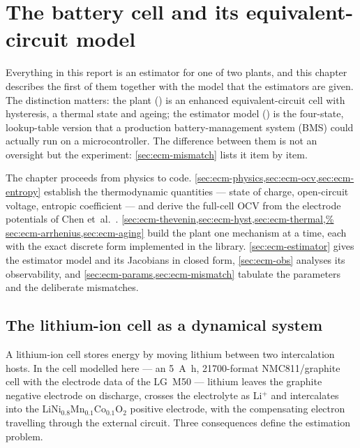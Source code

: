 \chapter{The battery cell and its equivalent-circuit model}
\label{ch:ecm}

Everything in this report is an estimator for one of two plants, and this chapter describes the
first of them together with the model that the estimators are given. The distinction matters:
the plant () is an enhanced equivalent-circuit cell
with hysteresis, a thermal state and ageing; the estimator model
() is the four-state, lookup-table version that a
production battery-management system (BMS) could actually run on a microcontroller. The
difference between them is not an oversight but the experiment: \cref{sec:ecm-mismatch} lists it
item by item.

The chapter proceeds from physics to code. \cref{sec:ecm-physics,sec:ecm-ocv,sec:ecm-entropy}
establish the thermodynamic quantities --- state of charge, open-circuit voltage, entropic
coefficient --- and derive the full-cell OCV from the electrode potentials of Chen
et~al.~\cite{chen2020parameterization}. \cref{sec:ecm-thevenin,sec:ecm-hyst,sec:ecm-thermal,%
sec:ecm-arrhenius,sec:ecm-aging} build the plant one mechanism at a time, each with the exact
discrete form implemented in the library. \cref{sec:ecm-estimator} gives the estimator model and
its Jacobians in closed form, \cref{sec:ecm-obs} analyses its observability, and
\cref{sec:ecm-params,sec:ecm-mismatch} tabulate the parameters and the deliberate mismatches.

\section{The lithium-ion cell as a dynamical system}
\label{sec:ecm-physics}

A lithium-ion cell stores energy by moving lithium between two intercalation hosts. In the cell
modelled here --- an \SI{5}{\ampere\hour}, 21700-format NMC811/graphite cell with the electrode
data of the LG~M50 \cite{chen2020parameterization} --- lithium leaves the graphite negative
electrode on discharge, crosses the electrolyte as Li$^+$ and intercalates into the
LiNi$_{0.8}$Mn$_{0.1}$Co$_{0.1}$O$_2$ positive electrode, with the compensating electron travelling
through the external circuit. Three consequences define the estimation problem.

